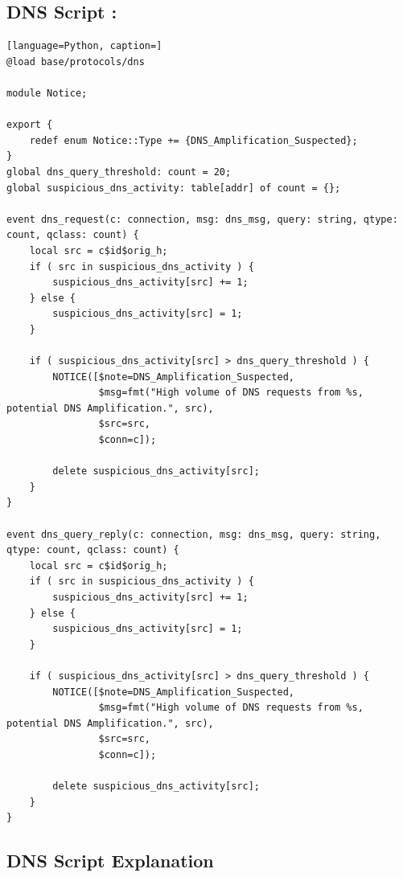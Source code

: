 \subsection{DNS Script :}
\begin{lstlisting}[language=Python, caption=]
@load base/protocols/dns

module Notice;

export {
    redef enum Notice::Type += {DNS_Amplification_Suspected};
}
global dns_query_threshold: count = 20;
global suspicious_dns_activity: table[addr] of count = {};

event dns_request(c: connection, msg: dns_msg, query: string, qtype: count, qclass: count) {
    local src = c$id$orig_h;
    if ( src in suspicious_dns_activity ) {
        suspicious_dns_activity[src] += 1;
    } else {
        suspicious_dns_activity[src] = 1;
    }

    if ( suspicious_dns_activity[src] > dns_query_threshold ) {
        NOTICE([$note=DNS_Amplification_Suspected,
                $msg=fmt("High volume of DNS requests from %s, potential DNS Amplification.", src),
                $src=src,
                $conn=c]);
                
        delete suspicious_dns_activity[src];
    }
}

event dns_query_reply(c: connection, msg: dns_msg, query: string, qtype: count, qclass: count) {
    local src = c$id$orig_h;
    if ( src in suspicious_dns_activity ) {
        suspicious_dns_activity[src] += 1;
    } else {
        suspicious_dns_activity[src] = 1;
    }

    if ( suspicious_dns_activity[src] > dns_query_threshold ) {
        NOTICE([$note=DNS_Amplification_Suspected,
                $msg=fmt("High volume of DNS requests from %s, potential DNS Amplification.", src),
                $src=src,
                $conn=c]);
                
        delete suspicious_dns_activity[src];
    }
}
\end{lstlisting}
\subsection{DNS Script Explanation}


